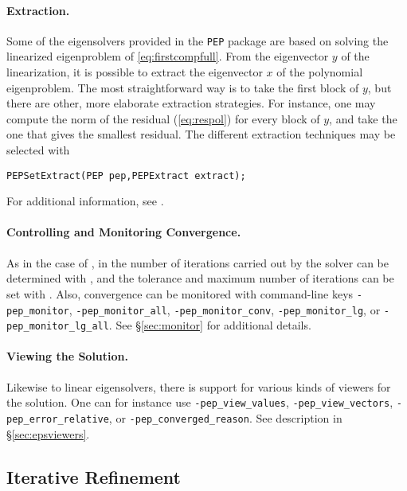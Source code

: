 \paragraph{Extraction.}

Some of the eigensolvers provided in the \texttt{PEP} package are based on solving the linearized eigenproblem of \eqref{eq:firstcompfull}. From the eigenvector $y$ of the linearization, it is possible to extract the eigenvector $x$ of the polynomial eigenproblem. The most straightforward way is to take the first block of $y$, but there are other, more elaborate extraction strategies. For instance, one may compute the norm of the residual (\ref{eq:respol}) for every block of $y$, and take the one that gives the smallest residual. The different extraction techniques may be selected with
	\begin{Verbatim}[fontsize=\small]
	PEPSetExtract(PEP pep,PEPExtract extract);
	\end{Verbatim}
For additional information, see \citep{Campos:2016:PKS}.

\paragraph{Controlling and Monitoring Convergence.}

As in the case of , in  the number of iterations carried out by the solver can be determined with , and the tolerance and maximum number of iterations can be set with . Also, convergence can be monitored with command-line keys \Verb!-pep_monitor!, \Verb!-pep_monitor_all!, \Verb!-pep_monitor_conv!, \Verb!-pep_monitor_lg!, or \Verb!-pep_monitor_lg_all!. See \S\ref{sec:monitor} for additional details.

\paragraph{Viewing the Solution.}

Likewise to linear eigensolvers, there is support for various kinds of viewers for the solution. One can for instance use \Verb!-pep_view_values!, \Verb!-pep_view_vectors!, \Verb!-pep_error_relative!, or \Verb!-pep_converged_reason!. See description in \S\ref{sec:epsviewers}.

\subsection{\label{sec:refine}Iterative Refinement}

